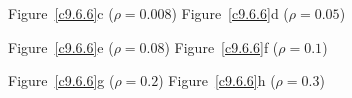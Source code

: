 \documentclass{ximera}
\begin{document}
\begin{computerExercise}
\begin{solution}
\begin{figure}[htb]
     \centerline{Figure~\ref{c9.6.6}c ($\rho = 0.008$)\hspace{1.3in} Figure~\ref{c9.6.6}d ($\rho = 0.05$)}
\end{figure}
\begin{figure}[htb]
     \centerline{%
     }
     \centerline{Figure~\ref{c9.6.6}e ($\rho = 0.08$)\hspace{1.3in} Figure~\ref{c9.6.6}f ($\rho = 0.1$)}
\end{figure}
\begin{figure}[htb]
     \centerline{%
     }
     \centerline{Figure~\ref{c9.6.6}g ($\rho = 0.2$)\hspace{1.3in} Figure~\ref{c9.6.6}h ($\rho = 0.3$)}
\end{figure}

\clearpage

\end{solution}
\end{computerExercise}
\end{document}
